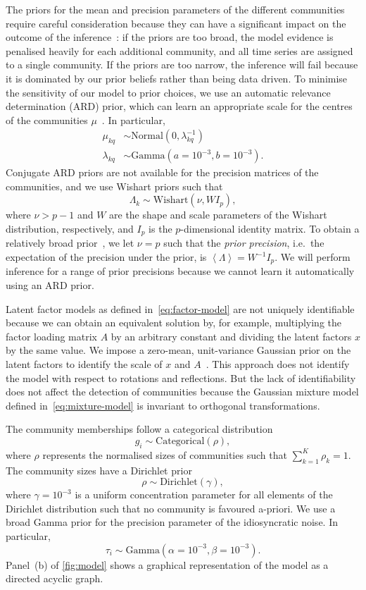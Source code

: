 \documentclass[onecolumn,pre,superscriptaddress, longbibliography, nofootinbib, notitlepage]{revtex4-1}
\newcommand{\E}[1]{\left\langle#1 \right\rangle}
\newcommand{\dist}{\sim}
\newcommand{\normal}{\mathrm{Normal}}
\newcommand{\categorical}{\mathrm{Categorical}}
\newcommand{\dgamma}{\mathrm{Gamma}}
\newcommand{\wishart}{\mathrm{Wishart}}
\newcommand{\dirichlet}{\mathrm{Dirichlet}}
\begin{document}
The priors for the mean and precision parameters of the different communities require careful consideration because they can have a significant impact on the outcome of the inference~\cite{Kass1995}: if the priors are too broad, the model evidence is penalised heavily for each additional community, and all time series are assigned to a single community. If the priors are too narrow, the inference will fail because it is dominated by our prior beliefs rather than being data driven. 
To minimise the sensitivity of our model to prior choices, we use an automatic relevance determination (ARD) prior, which can learn an appropriate scale for the centres of the communities $\mu$~\cite{Drugowitsch2013}. In particular,
\begin{align*}
    \mu_{kq}&\dist\normal(0, \lambda_{kq}^{-1})\\
    \lambda_{kq}&\dist\dgamma(a=10^{-3}, b=10^{-3}).
\end{align*}
Conjugate ARD priors are not available for the precision matrices of the communities, and we use Wishart priors such that
\[
    \Lambda_k \dist \wishart(\nu, W I_p),
\]
where $\nu > p - 1$ and $W$ are the shape and scale parameters of the Wishart distribution, respectively, and $I_p$ is the $p$-dimensional identity matrix. To obtain a relatively broad prior~\cite{Alvarez2014}, we let $\nu = p$ such that the \emph{prior precision}, i.e.\ the expectation of the precision under the prior, is $\E{\Lambda}=W^{-1}I_p$. We will perform inference for a range of prior precisions because we cannot learn it automatically using an ARD prior.

   
Latent factor models as defined in~\cref{eq:factor-model} are not uniquely identifiable because we can obtain an equivalent solution by, for example, multiplying the factor loading matrix $A$ by an arbitrary constant and dividing the latent factors $x$ by the same value. We impose a zero-mean, unit-variance Gaussian prior on the latent factors to identify the scale of $x$ and $A$~\cite{Luttinen2013}. This approach does not identify the model with respect to rotations and reflections. But the lack of identifiability does not affect the detection of communities because the Gaussian mixture model defined in~\cref{eq:mixture-model} is invariant to orthogonal transformations.

The community memberships follow a categorical distribution
\[
    g_{i} \dist \categorical(\rho),
\]
where $\rho$ represents the normalised sizes of communities such that $\sum_{k=1}^K\rho_k=1$. The community sizes have a Dirichlet prior
\[
    \rho \dist \dirichlet(\gamma),
\]
where $\gamma=10^{-3}$ is a uniform concentration parameter for all elements of the Dirichlet distribution such that no community is favoured a-priori. We use a broad Gamma prior for the precision parameter of the idiosyncratic noise. In particular,
\[
    \tau_i \dist \dgamma(\alpha=10^{-3}, \beta=10^{-3}).
\]
Panel~(b) of \cref{fig:model} shows a graphical representation of the model as a directed acyclic graph.
\end{document}
